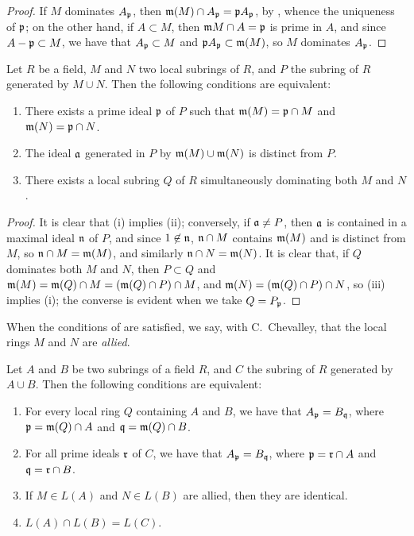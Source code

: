\begin{proof}
\label{proof-1.8.1.3}
If $M$ dominates $A_\mathfrak{p}$, then
$\mathfrak{m}(M)\cap A_\mathfrak{p}=\mathfrak{p}A_\mathfrak{p}$,
by , whence the uniqueness of $\mathfrak{p}$; on the other hand,
if $A\subset M$, then $\mathfrak{m}M\cap A=\mathfrak{p}$ is prime in $A$, and since
$A-\mathfrak{p}\subset M$, we have that $A_\mathfrak{p}\subset M$ and
$\mathfrak{p}A_\mathfrak{p}\subset\mathfrak{m}(M)$, so $M$ dominates
$A_\mathfrak{p}$.
\end{proof}

\begin{lem}[8.1.4]
\label{1.8.1.4}
Let $R$ be a field, $M$ and $N$ two local subrings of $R$, and $P$ the subring of $R$
generated by $M\cup N$. Then the following conditions are equivalent:
\begin{enumerate}[label={\rm(\roman*)}]
  \item There exists a prime ideal $\mathfrak{p}$ of $P$ such that
    $\mathfrak{m}(M)=\mathfrak{p}\cap M$ and $\mathfrak{m}(N)=\mathfrak{p}\cap N$.
  \item The ideal $\mathfrak{a}$ generated in $P$ by $\mathfrak{m}(M)\cup\mathfrak{m}(N)$ is
    distinct from $P$.
  \item There exists a local subring $Q$ of $R$ simultaneously dominating both $M$ and $N$.
\end{enumerate}
\end{lem}

\begin{proof}
\label{proof-1.8.1.4}
It is clear that (i) implies (ii); conversely, if $\mathfrak{a}\neq P$, then
$\mathfrak{a}$ is contained in a maximal ideal $\mathfrak{n}$ of $P$, and since
$1\not\in\mathfrak{n}$, $\mathfrak{n}\cap M$ contains $\mathfrak{m}(M)$ and is
distinct from $M$, so $\mathfrak{n}\cap M=\mathfrak{m}(M)$, and similarly
$\mathfrak{n}\cap N=\mathfrak{m}(N)$. It is clear that, if $Q$ dominates both
$M$ and $N$, then $P\subset Q$ and
$\mathfrak{m}(M)=\mathfrak{m}(Q)\cap M=(\mathfrak{m}(Q)\cap P)\cap M$, and
$\mathfrak{m}(N)=(\mathfrak{m}(Q)\cap P)\cap N$, so (iii) implies (i); the converse
is evident when we take $Q=P_\mathfrak{p}$.
\end{proof}

When the conditions of  are satisfied, we say, with C.~Chevalley,
that the local rings $M$ and $N$ are \emph{allied}.

\begin{prop}[8.1.5]
\label{1.8.1.5}
Let $A$ and $B$ be two subrings of a field $R$,
and $C$ the subring of $R$ generated by $A\cup B$. Then the following
conditions are equivalent:
\begin{enumerate}[label={\rm(\roman*)}]
  \item For every local ring $Q$ containing $A$ and $B$, we have that
    $A_\mathfrak{p}=B_\mathfrak{q}$, where $\mathfrak{p}=\mathfrak{m}(Q)\cap A$ and
    $\mathfrak{q}=\mathfrak{m}(Q)\cap B$.
  \item For all prime ideals $\mathfrak{r}$ of $C$, we have that
    $A_\mathfrak{p}=B_\mathfrak{q}$, where $\mathfrak{p}=\mathfrak{r}\cap A$ and
    $\mathfrak{q}=\mathfrak{r}\cap B$.
  \item If $M\in L(A)$ and $N\in L(B)$ are allied, then they are identical.
  \item $L(A)\cap L(B)=L(C)$.
\end{enumerate}
\end{prop}

